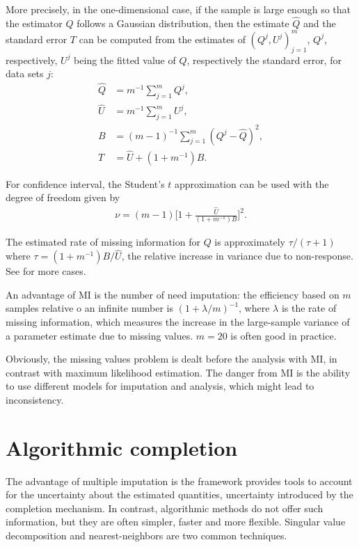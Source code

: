 More precisely, in the one-dimensional case, if the sample is large enough so
that the estimator $Q$ follows a Gaussian distribution, then the estimate
$\hat Q$ and the standard error $T$ can be computed from the estimates of
$(Q^j, U^j)_{j=1}^m$, $Q^j$, respectively, $U^j$ being the fitted value of $Q$,
respectively the standard error, for data sets $j$:
\begin{align*}
  \hat Q & = m^{-1} \sum_{j=1}^m Q^j, \\
  \hat U & = m^{-1} \sum_{j=1}^m U^j, \\
  B & = (m-1)^{-1}\sum_{j=1}^m(Q^j - \hat Q)^2, \\
  T & = \hat U + (1 + m^{-1}) B.
\end{align*}

For confidence interval, the Student's $t$ approximation can be used with the
degree of freedom given by
\begin{align*}
\nu = (m-1)\Big[1 + \frac{\hat U}{(1 + m^{-1})B} \Big]^2.
\end{align*}

The estimated rate of missing information for $Q$ is approximately
$\tau/(\tau+1)$ where $\tau = (1 + m^{-1})B/\hat U$, the relative increase in
variance due to non-response. See \cite{schafer1997analysis} for more cases.

An advantage of MI is the number of need imputation: the efficiency based on
$m$ samples relative o an infinite number is $(1 + \lambda/m)^{-1}$, where
$\lambda$ is the rate of missing information, which measures the increase in
the large-sample variance of a parameter estimate due to missing values. $m=20$
is often good in practice.

Obviously, the missing values problem is dealt before the analysis with MI, in
contrast with maximum likelihood estimation. The danger from MI is the ability
to use different models for imputation and analysis, which might lead to
inconsistency.

\section{Algorithmic completion}
\label{sec:compl-case}

The advantage of multiple imputation is the framework provides tools to account
for the uncertainty about the estimated quantities, uncertainty introduced by
the completion mechanism. In contrast, algorithmic methods do not offer such
information, but they are often simpler, faster and more flexible. Singular
value decomposition and nearest-neighbors are two common techniques.

